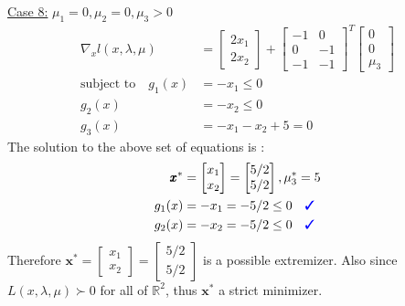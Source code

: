 \documentclass[a4paper,11pt]{article}
\newcommand{\V}[1]{\pmb{#1}}
\newcommand{\mat}[1]{\begin{bmatrix}#1\end{bmatrix}}
\newcommand{\cmark}{{\color{blue}\text{\ding{51}}}}%
\begin{document}
\noindent\underline{Case 8:} $\mu_1=0, \mu_2=0, \mu_3>0$
\begin{align*}
 \nabla_x l(x,\lambda,\mu) &= \mat{2x_1\\ 2x_2} +
\mat{-1& 0\\ 0& -1\\-1& -1}^T\mat{0\\ 0\\ \mu_3}\\
% 
 \text{subject to}\quad g_1(x)&=-x_1 \leq 0\\
 g_2(x)&=-x_2 \leq 0\\
 g_3(x)&= -x_1 -x_2 +5 =0 
\end{align*}
The solution to the above set of equations is :
\begin{align*}
 \V{x}^*&=\mat{x_1\\x_2} = \mat{5/2\\5/2},  \mu_3^*= 5\\
 g_1(x)&=-x_1 =-5/2\leq 0 \quad \cmark\\
 g_2(x)&=-x_2 =-5/2\leq 0 \quad \cmark
\end{align*}
Therefore $\V{x}^*=\mat{x_1\\x_2} = \mat{5/2\\5/2}$ is a possible extremizer. Also since $L(x,\lambda,\mu)\succ0$ for all of $\mathbb{R}^2$, thus $\V{x}^*$ a strict minimizer.

\clearpage
\end{document}
